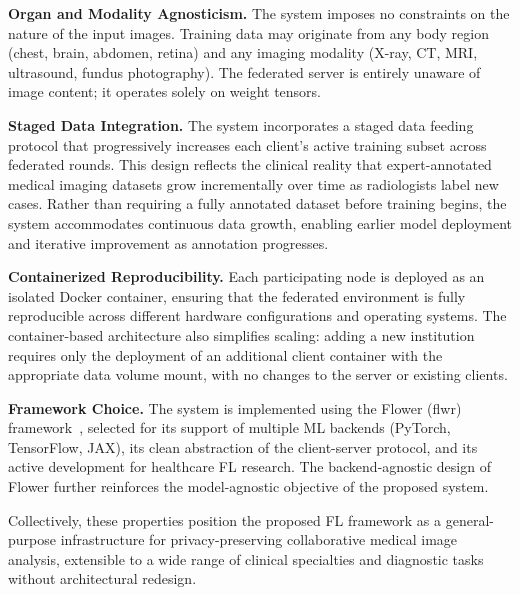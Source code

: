 \textbf{Organ and Modality Agnosticism.} The system imposes no constraints
on the nature of the input images. Training data may originate from any body
region (chest, brain, abdomen, retina) and any imaging modality (X-ray, CT,
MRI, ultrasound, fundus photography). The federated server is entirely
unaware of image content; it operates solely on weight tensors.
 
\textbf{Staged Data Integration.} The system incorporates a staged data
feeding protocol that progressively increases each client's active training
subset across federated rounds. This design reflects the clinical reality
that expert-annotated medical imaging datasets grow incrementally over time
as radiologists label new cases. Rather than requiring a fully annotated
dataset before training begins, the system accommodates continuous data
growth, enabling earlier model deployment and iterative improvement as
annotation progresses.
 
\textbf{Containerized Reproducibility.} Each participating node is deployed
as an isolated Docker container, ensuring that the federated environment is
fully reproducible across different hardware configurations and operating
systems. The container-based architecture also simplifies scaling: adding a
new institution requires only the deployment of an additional client
container with the appropriate data volume mount, with no changes to the
server or existing clients.
 
\textbf{Framework Choice.} The system is implemented using the Flower
(flwr) framework~\cite{beutel2022}, selected for its support of multiple
ML backends (PyTorch, TensorFlow, JAX), its clean abstraction of the
client-server protocol, and its active development for healthcare FL
research. The backend-agnostic design of Flower further reinforces the
model-agnostic objective of the proposed system.
 
Collectively, these properties position the proposed FL framework as a
general-purpose infrastructure for privacy-preserving collaborative medical
image analysis, extensible to a wide range of clinical specialties and
diagnostic tasks without architectural redesign.